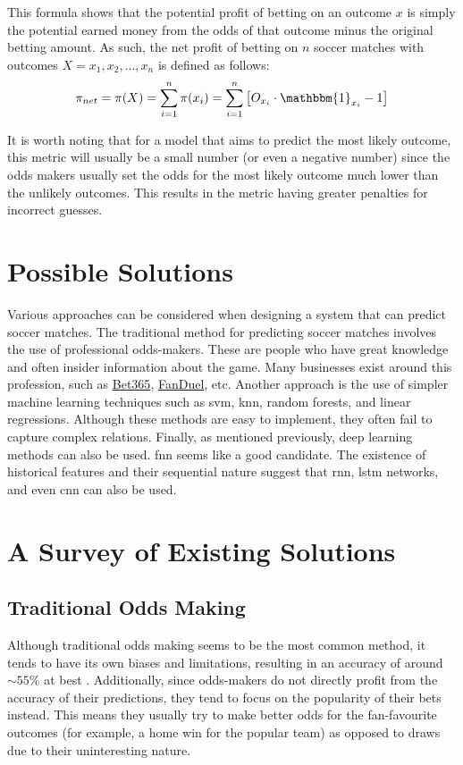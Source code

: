 \documentclass[rgb,listoffigures,listoftables,final]{cam-thesis}
\begin{document}
    This formula shows that the potential profit of betting on an outcome $x$ is simply the potential earned money from the odds of that outcome minus the original betting amount. As such, the net profit of betting on $n$ soccer matches with outcomes $X = x_1, x_2, ..., x_n$ is defined as follows:
    \[
        \pi_{net} = \pi(X) = \sum_{i=1}^n \pi(x_i) = \sum_{i=1}^n \left[O_{x_i} \cdot \mathbbm{1}_{x_i} - 1\right]
    \]

    It is worth noting that for a model that aims to predict the most likely outcome, this metric will usually be a small number (or even a negative number) since the odds makers usually set the odds for the most likely outcome much lower than the unlikely outcomes. This results in the metric having greater penalties for incorrect guesses.  

    \section{Possible Solutions}
    Various approaches can be considered when designing a system that can predict soccer matches. The traditional method for predicting soccer matches involves the use of professional odds-makers. These are people who have great knowledge and often insider information about the game. Many businesses exist around this profession, such as \href{https://www.bet365.com/hub/en-gb/football}{Bet365}, \href{https://sportsbook.fanduel.com/soccer}{FanDuel}, etc. Another approach is the use of simpler machine learning techniques such as \gls{svm}, \gls{knn}, random forests, and linear regressions. Although these methods are easy to implement, they often fail to capture complex relations. Finally, as mentioned previously, deep learning methods can also be used. \gls{fnn} seems like a good candidate. The existence of historical features and their sequential nature suggest that \gls{rnn}, \gls{lstm} networks, and even \gls{cnn} can also be used.
    
    \section{A Survey of Existing Solutions}
    \subsection{Traditional Odds Making}
    Although traditional odds making seems to be the most common method, it tends to have its own biases and limitations, resulting in an accuracy of around $\sim 55\%$ at best \cite{socceranalytics}. Additionally, since odds-makers do not directly profit from the accuracy of their predictions, they tend to focus on the popularity of their bets instead. This means they usually try to make better odds for the fan-favourite outcomes (for example, a home win for the popular team) as opposed to draws due to their uninteresting nature.
\end{document}
